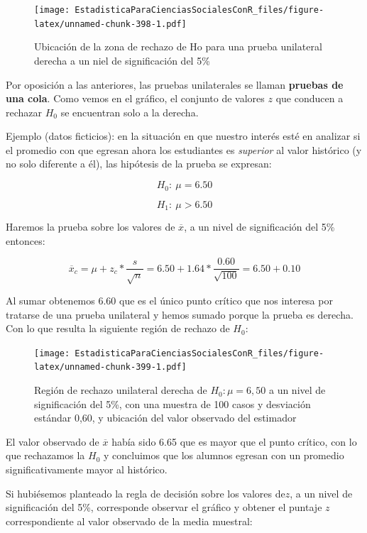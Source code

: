 \documentclass[]{book}
\begin{document}
\begin{figure}
\centering
\texttt{[image: EstadisticaParaCienciasSocialesConR\_files/figure-latex/unnamed-chunk-398-1.pdf]}
\caption{\label{fig:unnamed-chunk-398}Ubicación de la zona de rechazo de Ho para una prueba unilateral derecha a un niel de significación del 5\%}
\end{figure}

Por oposición a las anteriores, las pruebas unilaterales se llaman
\textbf{pruebas de una cola}. Como vemos en el gráfico, el conjunto de
valores \(z\) que conducen a rechazar \(H_{0}\) se encuentran solo a la
derecha.

Ejemplo (datos ficticios): en la situación en que nuestro interés esté
en analizar si el promedio con que egresan ahora los estudiantes es
\emph{superior} al valor histórico (y no solo diferente a él), las hipótesis
de la prueba se expresan:

\[H_{0}:\ \mu = 6.50\]

\[H_{1}:\ \mu > 6.50\]

Haremos la prueba sobre los valores de \(\overline{x}\), a un nivel de
significación del 5\% entonces:

\[{\overline{x}}_{c} = \mu + z_{c}*\frac{s}{\sqrt{n}} = 6.50 + 1.64*\frac{0.60}{\sqrt{100}} = 6.50 + 0.10\]

Al sumar obtenemos 6.60 que es el único punto crítico que nos interesa
por tratarse de una prueba unilateral y hemos sumado porque la prueba es derecha. Con lo que resulta la siguiente región de rechazo de \(H_{0}\):

\begin{figure}
\centering
\texttt{[image: EstadisticaParaCienciasSocialesConR\_files/figure-latex/unnamed-chunk-399-1.pdf]}
\caption{\label{fig:unnamed-chunk-399}Región de rechazo unilateral derecha de \(H_{0}: \mu = 6,50\) a un nivel de significación del 5\%, con una muestra de 100 casos y desviación estándar 0,60, y ubicación del valor observado del estimador}
\end{figure}

El valor observado de \(\overline{x}\) había sido 6.65 que es mayor que el punto crítico, con lo que rechazamos la \(H_{0}\) y concluimos que los
alumnos egresan con un promedio significativamente mayor al histórico.

Si hubiésemos planteado la regla de decisión sobre los valores de\(z\), a
un nivel de significación del 5\%, corresponde observar el gráfico y obtener el puntaje \(z\) correspondiente al valor observado de la media muestral:
\end{document}
